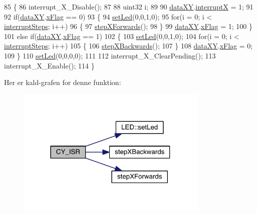 \begin{DoxyCode}
85 \{
86   interrupt\_X\_Disable();
87   
88   uint32 i;
89   
90   \hyperlink{data_8h_a89d7998a721b3f36f9f4131e7a5e42d2}{dataXY}.\hyperlink{data_8h_a4cacb2964bb4b589bf79aa64a398725b}{interruptX} = 1;
91   
92   \textcolor{keywordflow}{if}(\hyperlink{data_8h_a89d7998a721b3f36f9f4131e7a5e42d2}{dataXY}.\hyperlink{data_8h_abd60bb18cb69d4a782e0334caad9ffbc}{xFlag} == 0)
93   \{
94     \hyperlink{led_8h_a1d8e725e3829da99c1d027ba0a2ce57a}{setLed}(0,0,1,0);
95     \textcolor{keywordflow}{for}(i = 0; i < \hyperlink{xy_8h_a319d8f8cbb816fc1ca2306587712b0b7}{interruptSteps}; i++)
96     \{
97       \hyperlink{class_x_y_a77f23b16c6fae141a892ed476b325184}{stepXForwards}();
98     \}
99     \hyperlink{data_8h_a89d7998a721b3f36f9f4131e7a5e42d2}{dataXY}.\hyperlink{data_8h_abd60bb18cb69d4a782e0334caad9ffbc}{xFlag} = 1;
100   \}
101   \textcolor{keywordflow}{else} \textcolor{keywordflow}{if}(\hyperlink{data_8h_a89d7998a721b3f36f9f4131e7a5e42d2}{dataXY}.\hyperlink{data_8h_abd60bb18cb69d4a782e0334caad9ffbc}{xFlag} == 1)
102   \{
103     \hyperlink{led_8h_a1d8e725e3829da99c1d027ba0a2ce57a}{setLed}(0,0,1,0);
104     \textcolor{keywordflow}{for}(i = 0; i < \hyperlink{xy_8h_a319d8f8cbb816fc1ca2306587712b0b7}{interruptSteps}; i++)
105     \{
106       \hyperlink{class_x_y_a30e07320705aa878e1f5a1b959eba099}{stepXBackwards}();
107     \}
108     \hyperlink{data_8h_a89d7998a721b3f36f9f4131e7a5e42d2}{dataXY}.\hyperlink{data_8h_abd60bb18cb69d4a782e0334caad9ffbc}{xFlag} = 0;
109   \}
110   \hyperlink{led_8h_a1d8e725e3829da99c1d027ba0a2ce57a}{setLed}(0,0,0,0);
111   
112   interrupt\_X\_ClearPending();
113   interrupt\_X\_Enable();
114 \}
\end{DoxyCode}


Her er kald-\/grafen for denne funktion\+:\nopagebreak
\begin{figure}[H]
\begin{center}
\leavevmode
\includegraphics[width=259pt]{db/d87/class_x_y_acf3833934859a01c669d97fc4dfd7f41_cgraph}
\end{center}
\end{figure}


